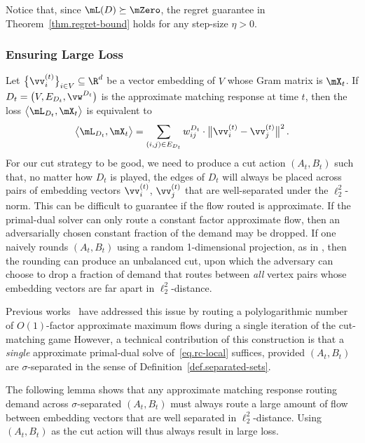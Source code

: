 \documentclass[letterpaper]{article}
\begin{document}
\noindent
Notice that, since $\mL(D) \succeq \mZero$, the regret guarantee in Theorem~\ref{thm.regret-bound} holds for any step-size $\eta > 0$.


\subsubsection{Ensuring Large Loss}
Let $\big\{ \vv^{(t)}_i \big\}_{i \in V} \subseteq \R^d$ be a vector embedding of $V$ whose Gram matrix is $\mX_t$. If $D_t = \big( V, E_{D_t}, \vw^{D_t} \big)$ is the approximate matching response at time $t$, then the loss $\big\langle \mL_{D_t}, \mX_t \big\rangle$ is equivalent to
\begin{equation*}
\big\langle \mL_{D_t}, \mX_t \big\rangle
= \sum_{(i,j) \in E_{D_t}} w_{ij}^{D_t} \cdot \big\lVert \vv^{(t)}_i - \vv^{(t)}_j \big\rVert^2 \, .
\end{equation*}
For our cut strategy to be good, we need to produce a cut action $(A_t, B_t)$ such that, no matter how $D_t$ is played, the edges of $D_t$ will always be placed across pairs of embedding vectors $\vv^{(t)}_i$, $\vv^{(t)}_j$ that are well-separated under the $\ell_2^2$-norm. This can be difficult to guarantee if the flow routed is approximate. If the primal-dual solver can only route a constant factor approximate flow, then an adversarially chosen constant fraction of the demand may be dropped. If one naively rounds $(A_t, B_t)$ using a random 1-dimensional projection, as in \cite{arora2007combinatorial, orecchia2012balanced_separator}, then the rounding can produce an unbalanced cut, upon which the adversary can choose to drop a fraction of demand that routes between \emph{all} vertex pairs whose embedding vectors are far apart in $\ell_2^2$-distance.

Previous works~\cite{chuzhoyNewAlgorithmDecremental2019, chuzhoy2020deterministic, nanongkai2017dynamic} have addressed this issue by routing a polylogarithmic number of $O(1)$-factor approximate maximum flows during a single iteration of the cut-matching game
However, a technical contribution of this construction is that a \emph{single} approximate primal-dual solve of~\eqref{eq.rc-local} suffices, provided $(A_t, B_t)$ are $\sigma$-separated in the sense of Definition~\eqref{def.separated-sets}.

The following lemma shows that any approximate matching response routing demand across $\sigma$-separated $(A_t, B_t)$ must always route a large amount of flow between embedding vectors that are well separated in $\ell_2^2$-distance. Using $(A_t, B_t)$ as the cut action will thus always result in large loss.
\end{document}
